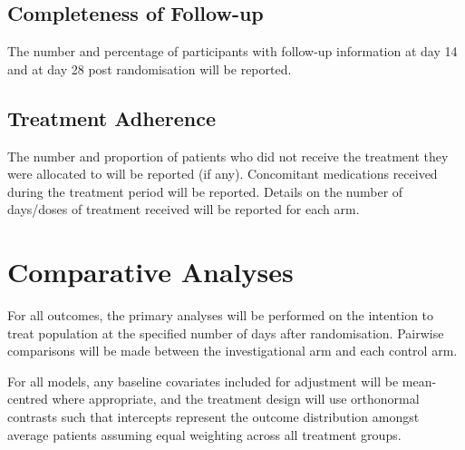 \documentclass[11pt,parskip=full-]{scrartcl}
\begin{document}
\subsection{Completeness of Follow-up}
The number and percentage of participants with follow-up information at day 14 and at day 28 post randomisation will be reported.

\subsection{Treatment Adherence}
The number and proportion of patients who did not receive the treatment they were allocated to will be reported (if any). Concomitant medications received during the treatment period will be reported. Details on the number of days/doses of treatment received will be reported for each arm.

\clearpage

\section{Comparative Analyses}

For all outcomes, the primary analyses will be performed on the intention to treat population at the specified number of days after randomisation. Pairwise comparisons will be made between the investigational arm and each control arm.

For all models, any baseline covariates included for adjustment will be mean-centred where appropriate, and the treatment design will use orthonormal contrasts such that intercepts represent the outcome distribution amongst average patients assuming equal weighting across all treatment groups.
\end{document}

